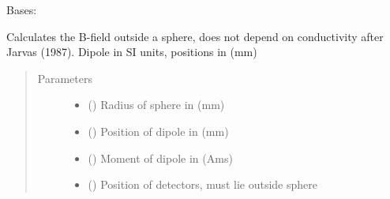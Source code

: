 \documentclass[letterpaper,10pt,english,openany,oneside]{sphinxmanual}
\begin{document}
\begin{fulllineitems}
\label{\detokenize{pygpc.testfunctions:pygpc.testfunctions.testfunctions.BfieldOutsideSphere}}
Bases: {\hyperref[\detokenize{pygpc:pygpc.AbstractModel.AbstractModel}]{}}

Calculates the B-field outside a sphere, does not depend on conductivity after Jarvas (1987).
Dipole in SI units, positions in (mm)
\begin{quote}\begin{description}
\item[{Parameters}] \leavevmode\begin{itemize}
\item {} 
\sphinxstyleliteralstrong{\sphinxupquote{{[}}}\sphinxstyleliteralstrong{\sphinxupquote{{]}}} () \textendash{} Radius of sphere in (mm)

\item {} 
\sphinxstyleliteralstrong{\sphinxupquote{{[}}}\sphinxstyleliteralstrong{\sphinxupquote{{]}}} (\sphinxstyleliteralemphasis{\sphinxupquote{ {[}}}\sphinxstyleliteralemphasis{\sphinxupquote{{]}}}) \textendash{} Position of dipole in (mm)

\item {} 
\sphinxstyleliteralstrong{\sphinxupquote{{[}}}\sphinxstyleliteralstrong{\sphinxupquote{{]}}} (\sphinxstyleliteralemphasis{\sphinxupquote{ {[}}}\sphinxstyleliteralemphasis{\sphinxupquote{{]}}}) \textendash{} Moment of dipole in (Ams)

\item {} 
\sphinxstyleliteralstrong{\sphinxupquote{{[}}}\sphinxstyleliteralstrong{\sphinxupquote{{]}}} (\sphinxstyleliteralemphasis{\sphinxupquote{ {[}}}\sphinxstyleliteralemphasis{\sphinxupquote{{]}}}) \textendash{} Position of detectors, must lie outside sphere


\end{itemize}
\end{description}
\end{quote}
\end{fulllineitems}
\end{document}
